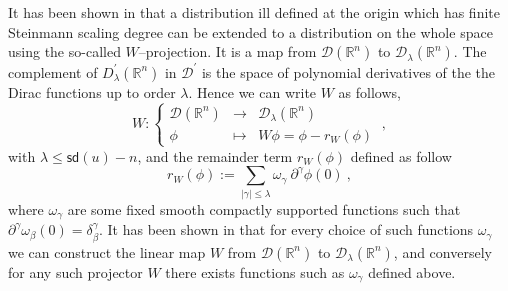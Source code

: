 \documentclass[11pt]{book}
\newcommand{\sd}{\mathsf{sd}}
\newcommand{\abs}[1]{\left|#1\right|}
\newcommand{\Dcal}{\mathcal{D}}
\newcommand{\Rbb}{\mathbb{R}}
\theoremstyle{break}
\begin{document}
It has been shown in \cite{brunetti_microlocal_2000} that a distribution ill defined at the origin which has finite Steinmann scaling degree can be extended to a distribution on the whole space using the so-called $W$--projection. It is a map from $\Dcal(\Rbb^n)$ to $\Dcal_\lambda(\Rbb^n)$. The complement of $D^\prime_\lambda(\Rbb^n)$ in $\Dcal^\prime$ is the space of polynomial derivatives of the the Dirac functions up to order $\lambda$. Hence we can write $W$ as follows,
%
\begin{equation}
W : \left\{
\begin{array}{ccl}
\Dcal(\Rbb^n) & \to & \Dcal_\lambda(\Rbb^n) \\
\phi & \mapsto & W \phi = \phi - r_W(\phi)
\end{array}
\right. \ , \label{eq:w_projection}
\end{equation}
%
with $\lambda \leq \sd(u)-n$, and the remainder term $r_W(\phi)$ defined as follow
%
\begin{equation*}
r_W(\phi) := \underset{\abs{\gamma}\leq\lambda}{\sum} \omega_\gamma \ \partial^\gamma \phi(0) \ ,
\end{equation*}
%
where $\omega_\gamma$ are some fixed smooth compactly supported functions such that $\partial^\gamma\omega_\beta(0) = \delta^\gamma_\beta$. It has been shown in \cite[lemma 11]{duetsch_causal_2004} that for every choice of such functions $\omega_\gamma$ we can construct the linear map $W$ from $\Dcal(\Rbb^n)$ to $\Dcal_\lambda(\Rbb^n)$, and conversely for any such projector $W$ there exists functions such as $\omega_\gamma$ defined above.
\end{document}
